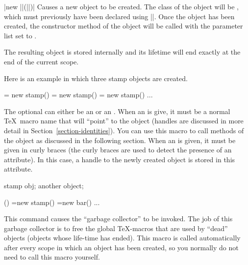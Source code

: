 \begin{command}{\pgfoonew{}|new ||(||)|}
  Causes a new object to be created. The class of the object will be
  , which must previously have been declared using
  |\pgfooclass|. Once the object has been created, the constructor
  method of the object will be called with the parameter list set to
  .

  The resulting object is stored internally and its lifetime will
  end exactly at the end of the current scope.

  Here is an example in which three stamp objects are created.
\begin{codeexample}
\pgfoonew \firststamp  = new stamp()    
\pgfoonew \secondstamp = new stamp()
{
  \pgfoonew \thirdstamp = new stamp()
  ...
}
\end{codeexample}

  The optional  can either be an
   or an . When an  is give, it must be a normal \TeX\ macro name that will
  ``point'' to the object (handles are discussed in more detail in
  Section~\ref{section-identities}). You can use this macro to call
  methods of the object as discussed in the following section. When an
   is given, it must be given in curly braces (the
  curly braces are used to detect the presence of an attribute). In
  this case, a handle to the newly created object is stored in this
  attribute. 
\begin{codeexample}
{
  \attribute stamp obj;
  \attribute another object;

  \method \foo() {
    =new stamp()
    =new bar()
  }
  ...
}
\end{codeexample}
\end{command}

\begin{command}{\pgfoogc}
  This command causes the ``garbage collector'' to be invoked. The job
  of this garbage collector is to free the global \TeX-macros that are
  used by ``dead'' objects (objects whose life-time has ended). This
  macro is called automatically after every scope in which an object
  has been created, so you normally do not need to call this macro
  yourself.
\end{command}


